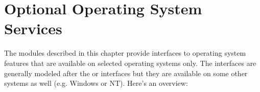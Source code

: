 \chapter{Optional Operating System Services}
\label{someos}

The modules described in this chapter provide interfaces to operating
system features that are available on selected operating systems only.
The interfaces are generally modeled after the \UNIX{} or \C{}
interfaces but they are available on some other systems as well
(e.g. Windows or NT).  Here's an overview:

\localmoduletable

